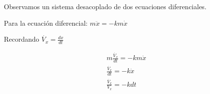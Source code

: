Observamos un sistema desacoplado de dos ecuaciones diferenciales.


Para la ecuación diferencial: $ m\ddot{x} = -km\dot{x} $

Recordando $ \dot{V_{x}} = \frac{dx}{dt} $


\begin{gather*}
    m\frac{\dot{V_{x}}}{dt} = -km\dot{x} \\
    \frac{\dot{V_{x}}}{dt} = -k\dot{x} \\
    \frac{\dot{V_{x}}}{V_{x}} = -kdt
\end{gather*}


